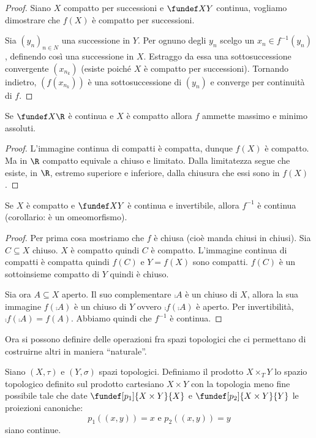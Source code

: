 \begin{proof}
	Siano $X$ compatto per successioni e $\fundef XY$ continua, vogliamo dimostrare che $f(X)$ è compatto per successioni.
	
	Sia $(y_n)_{n\in N}$ una successione in $Y$. Per ognuno degli $y_n$ scelgo un $x_n\in f^{-1}(y_n)$, definendo così una successione in $X$.
	Estraggo da essa una sottosuccessione convergente $(x_{n_k})$ (esiste poiché $X$ è compatto per successioni).
	Tornando indietro, $(f(x_{n_k}))$ è una sottosuccessione di $(y_n)$ e converge per continuità di $f$.
\end{proof}

\begin{lemma}
	Se $\fundef X\R$ è continua e $X$ è compatto allora $f$ ammette massimo e minimo assoluti.
\end{lemma}

\begin{proof}
	L'immagine continua di compatti è compatta, dunque $f(X)$ è compatto. Ma in $\R$ compatto equivale a chiuso e limitato. Dalla limitatezza segue che esiste, in $\R$, estremo superiore e inferiore, dalla chiusura che essi sono in $f(X)$.
\end{proof}

\begin{lemma}
	Se $X$ è compatto e $\fundef XY$ è continua e invertibile, allora $f^{-1}$ è continua (corollario: è un omeomorfismo).
\end{lemma}

\begin{proof}
	Per prima cosa mostriamo che $f$ è chiusa (cioè manda chiusi in chiusi).
	Sia $C\subseteq X$ chiuso.
	$X$ è compatto quindi $C$ è compatto.
	L'immagine continua di compatti è compatta quindi $f(C)$ e $Y=f(X)$ sono compatti.
	$f(C)$ è un sottoinsieme compatto di $Y$ quindi è chiuso.
	
	Sia ora $A\subseteq X$ aperto.
	Il suo complementare $\comp A$ è un chiuso di $X$, allora la sua immagine $f(\comp A)$ è un chiuso di $Y$ ovvero $\comp{f(\comp A)}$ è aperto.
	Per invertibilità, $\comp{f(\comp A)}=f(A)$.
	Abbiamo quindi che $f^{-1}$ è continua.
\end{proof}

Ora si possono definire delle operazioni fra spazi topologici che ci permettano di costruirne altri in maniera ``naturale''.

\begin{defn}
Siano $(X,\tau)$ e $(Y, \sigma)$ spazi topologici. Definiamo il prodotto $X\times_T Y$ lo spazio topologico definito sul prodotto cartesiano $X\times Y$ con la topologia meno fine possibile tale che date $\fundef[p_1]{X\times Y}{X}$ e $\fundef[p_2]{X\times Y}{Y}$ le proiezioni canoniche:
\begin{equation}
 p_1((x, y))=x \text{  e  } p_2((x, y))=y
\end{equation} 
siano continue.
\end{defn}

